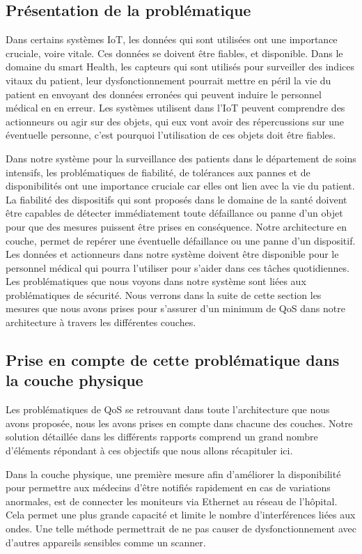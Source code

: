 \subsection{Présentation de la problématique}
 
Dans certains systèmes IoT, les données qui sont utilisées ont une importance cruciale, voire vitale. Ces données se doivent être fiables, et disponible. Dans le domaine du smart Health, les capteurs qui sont utilisés pour surveiller des indices vitaux du patient, leur dysfonctionnement pourrait mettre en péril la vie du patient en envoyant des données erronées qui peuvent induire le personnel médical en en erreur. Les systèmes utilisent dans l’IoT peuvent comprendre des actionneurs ou agir sur des objets, qui eux vont avoir des répercussions sur une éventuelle personne, c’est pourquoi l’utilisation de ces objets doit être fiables.

Dans notre système pour la surveillance des patients dans le département de soins intensifs, les problématiques de fiabilité, de tolérances aux pannes et de disponibilités ont une importance cruciale car elles ont lien avec la vie du patient. La fiabilité des dispositifs qui sont proposés dans le domaine de la santé doivent être capables de détecter immédiatement toute défaillance ou panne d’un objet pour que des mesures puissent être prises en conséquence. Notre architecture en couche, permet de repérer une éventuelle défaillance ou une panne d’un dispositif. Les données et actionneurs dans notre système doivent être disponible pour le personnel médical qui pourra l’utiliser pour s’aider dans ces tâches quotidiennes. Les problématiques que nous voyons dans notre système sont liées aux problématiques de sécurité. Nous verrons dans la suite de cette section les mesures que nous avons prises pour s’assurer d’un minimum de QoS dans notre architecture à travers les différentes couches.
 
\subsection{Prise en compte de cette problématique dans la couche physique}

Les problématiques de QoS se retrouvant dans toute l’architecture que nous avons proposée, nous les avons prises en compte dans chacune des couches. Notre solution détaillée dans les différents rapports comprend un grand nombre d’éléments répondant à ces objectifs que nous allons récapituler ici.

Dans la couche physique, une première mesure afin d’améliorer la disponibilité pour permettre aux médecins d’être notifiés rapidement en cas de variations anormales, est de connecter les moniteurs via Ethernet au réseau de l’hôpital. Cela permet une plus grande capacité et limite le nombre d’interférences liées aux ondes. Une telle méthode permettrait de ne pas causer de dysfonctionnement avec d’autres appareils sensibles comme un scanner.

